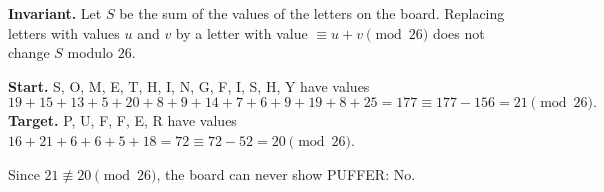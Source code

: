 \textbf{Invariant.} Let $S$ be the sum of the values of the letters on the board. Replacing letters with values $u$ and $v$ by a letter with value $\equiv u+v\pmod{26}$ does not change $S$ modulo $26$.

\textbf{Start.} S, O, M, E, T, H, I, N, G, F, I, S, H, Y have values
\[19+15+13+5+20+8+9+14+7+6+9+19+8+25=177\equiv177-156=21\pmod{26}.\]
\textbf{Target.} P, U, F, F, E, R have values $16+21+6+6+5+18=72\equiv72-52=20\pmod{26}$.

Since $21\not\equiv20\pmod{26}$, the board can never show PUFFER: $\boxed{\text{No}}$.
